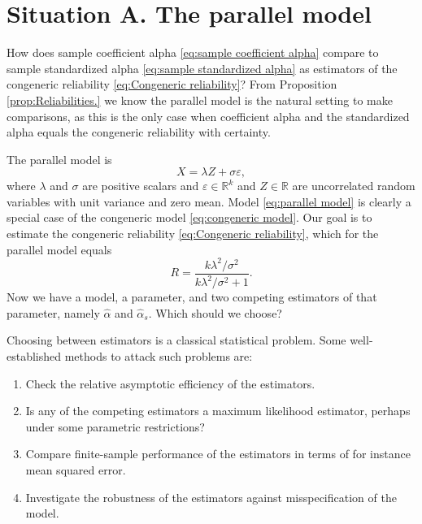 \documentclass[twoside]{article}
\DeclareMathOperator{\Cor}{Cor}
\renewcommand{\sqrt}[1]{{(#1)^{1/2}}}
\begin{document}
\section{Situation A. The parallel model}
\label{sec:argument A}

How does sample coefficient alpha \eqref{eq:sample coefficient alpha} compare to sample standardized alpha \eqref{eq:sample standardized alpha} as estimators of the congeneric reliability \eqref{eq:Congeneric reliability}? From Proposition \ref{prop:Reliabilities.} we know the parallel model is the natural setting to make comparisons, as this is the only case when coefficient alpha and the standardized alpha equals the congeneric reliability with certainty.

The parallel model is
\begin{equation}
\label{eq:parallel model}
X = \lambda Z + \sigma\varepsilon,
\end{equation}
where $\lambda$ and $\sigma$ are positive scalars and $\varepsilon\in\mathbb{R}^k$ and $Z\in\mathbb{R}$ are uncorrelated random variables with unit variance and zero mean. Model \eqref{eq:parallel model} is clearly a special case of the congeneric model \eqref{eq:congeneric model}. Our goal is to estimate the congeneric reliability \eqref{eq:Congeneric reliability}, which for the parallel model equals
\begin{equation}
\label{eq:parallel_omega}
 R = \frac{k\lambda^2/\sigma^2}{k\lambda^2/\sigma^2 + 1}.
\end{equation}
Now we have a model, a parameter, and two competing estimators of that parameter, namely $\hat{\alpha}$ and $\hat{\alpha}_s$. Which should we choose? 

Choosing between estimators is a classical statistical problem. Some well-established methods to attack such problems are:


\begin{enumerate}[label=(\Alph*)]
\item Check the relative asymptotic efficiency of the estimators.
\item Is any of the competing estimators a maximum likelihood estimator, perhaps under some parametric restrictions?
\item Compare finite-sample performance of the estimators in terms of for instance mean squared error.
\item Investigate the robustness of the estimators against misspecification of the model.
\end{enumerate}
\end{document}
